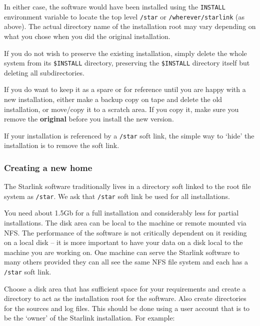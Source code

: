 \documentclass[twoside,11pt]{article}
\newcommand{\xlabel}[1]{}
\renewcommand{\_}{\texttt{\symbol{95}}}
\begin{document}
In either case, the software would have been installed using the
\texttt{INSTALL} environment variable to locate the top level
\texttt{/star} or \texttt{/wherever/starlink} (as above).  The actual
directory name of the installation root may vary depending on what you
chose when you did the original installation.

If you do not wish to preserve the existing installation, simply delete the
whole system from its \texttt{\$INSTALL} directory, preserving the
\texttt{\$INSTALL} directory itself but deleting all subdirectories.

If you do want to keep it as a spare or for reference until you are happy
with a new installation, either make a backup copy on tape and delete the
old installation, or move/copy it to a scratch area.  If you copy it, make
sure you remove the \textbf{original} before you install the new version.

If your installation is referenced by a \texttt{/star} soft link, the
simple way to `hide' the installation is to remove the soft link.

\subsubsection{\xlabel{creating_a_new_home}Creating a new home}
\label{creating_a_new_home}

The Starlink software traditionally lives in a directory soft linked to
the root file system as \texttt{/star}. We ask that \texttt{/star} soft link
be used for all installations.


You need about 1.5Gb for a full installation and considerably less for
partial installations.  The disk area can be local to the machine or
remote mounted via NFS\@.  The performance of the software is not critically
dependent on it residing on a local disk -- it is more important to have
your data on a disk local to the machine you are working on.  One machine
can serve the Starlink software to many others provided they can all see
the same NFS file system and each has a \texttt{/star} soft link.

Choose a disk area that has sufficient space for your requirements and
create a directory to act as the installation root for the software.  Also
create directories for the sources and log files.  This should be done
using a user account that is to be the `owner' of the Starlink
installation.  For example:
\end{document}
